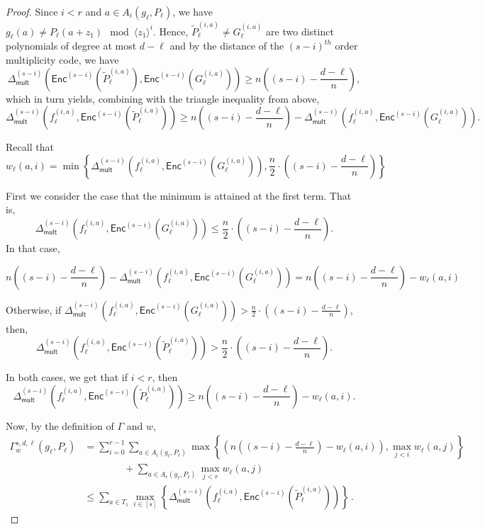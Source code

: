\documentclass{article}
\renewcommand{\tilde}[1]{\widetilde{#1}}
\newcommand{\enc}{{\mathsf{Enc}}}
\newcommand{\Delm}{\Delta_{\mathsf{mult}}}
\begin{document}
\begin{proof}
		Since $i <r$ and
		$a \in A_i(g_\ell, P_\ell)$, we have
		$g_\ell(a)\neq P_\ell(a+z_1) \mod \langle z_1\rangle^{i}$. Hence,
		$\tilde{P}_{\ell}^{(i,a)}\neq G_{\ell}^{(i,a)}$ are two distinct polynomials of degree at
		most $d-\ell$ and by the distance of the $(s-i)^{th}$ order
		multiplicity code, we have
		\[\Delm^{(s-i)} \left(\enc^{(s-i)}\left(\tilde{P}_{\ell}^{(i, a)}\right), \enc^{(s-i)}\left(G_{\ell}^{(i, a)}\right)\right)  \geq n\left((s-i) - \frac{d-\ell}n\right),  \]
		which in turn yields, combining with the triangle inequality from above,
		\[ \Delm^{(s-i)} \left(f_{\ell}^{(i, a)}, \enc^{(s-i)}\left(\tilde{P}_{\ell}^{(i, a)}\right)\right) \geq n\left((s-i) - \frac{d-\ell}n\right) - \Delm^{(s-i)} \left(f_{\ell}^{(i, a)}, \enc^{(s-i)}\left(G_{\ell}^{(i, a)}\right)\right).\]
		
		Recall that \[ w_\ell(a,i) = \min
		\left\{\Delm^{\left(s-i\right)}\left(f_\ell^{\left(i,
			a\right)} , \enc^{(s-i)}\left(G_\ell^{\left(i, a\right)}\right) \right), \frac{n}2\cdot\left((s-i)-\frac{d-\ell}n\right)\right\} \]
		
		First we consider the case that the minimum is attained at the first term. That is, \[\Delm^{(s-i)} \left(f_{\ell}^{(i, a)}, \enc^{(s-i)}\left(G_{\ell}^{(i, a)}\right)\right) \leq \frac{n}2\cdot\left((s-i)-\frac{d-\ell}n\right).\] In that case, 
		
		\[ n\left((s-i) - \frac{d-\ell}n\right) - \Delm^{(s-i)} \left(f_{\ell}^{(i, a)}, \enc^{(s-i)}\left(G_{\ell}^{(i, a)}\right)\right) = n\left((s-i) - \frac{d-\ell}n\right) - w_{\ell}(a,i) \]
		
		Otherwise, if $ \Delm^{(s-i)} \left(f_{\ell}^{(i, a)}, \enc^{(s-i)}\left(G_{\ell}^{(i, a)}\right)\right)>  \frac{n}2\cdot\left((s-i)-\frac{d-\ell}n\right)$, then, 
		\[ \Delm^{(s-i)} \left(f_{\ell}^{(i, a)}, \enc^{(s-i)}\left(\tilde{P}_{\ell}^{(i, a)}\right)\right)>  \frac{n}2\cdot\left((s-i)-\frac{d-\ell}n\right). \]
		
		In both cases, we get that if $i<r$, then
		\[ \Delm^{(s-i)} \left(f_{\ell}^{(i, a)}, \enc^{(s-i)}\left(\tilde{P}_{\ell}^{(i, a)}\right)\right) \geq n\left((s-i) - \frac{d-\ell}n\right) - w_{\ell}(a,i).\]
		
		Now, by the definition of $\Gamma$ and $w$, 
		\[ 
		\begin{split}
			\Gamma_w^{s, d, \ell}\left(g_\ell, P_\ell\right) & = \sum_{i = 0}^{r-1} \sum_{a \in A_i\left(g_\ell, P_\ell\right)} \max \left\{\left(n\left((s-i) - \frac{d-\ell}n\right) - w_{\ell}(a,i)\right), \max_{j < i} w_{\ell}(a, j) \right\}\\
            & \qquad \qquad + \sum_{a \in A_r\left(g_\ell, P_\ell\right)} \max_{j < r} w_{\ell}(a, j)\\
			& \leq \sum_{a \in T_1} \max_{i \in [s]} \left\{\Delm^{(s-i)} \left(f_{\ell}^{(i, a)}, \enc^{(s-i)}\left(\tilde{P}_{\ell}^{(i, a)}\right)\right)\right\}\,. 
		\end{split}
		\] 
		

\end{proof}
\end{document}
